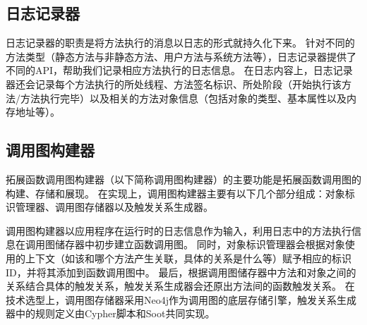 









\subsection{日志记录器}

日志记录器的职责是将方法执行的消息以日志的形式就持久化下来。
针对不同的方法类型（静态方法与非静态方法、用户方法与系统方法等），日志记录器提供了不同的API，帮助我们记录相应方法执行的日志信息。
在日志内容上，日志记录器还会记录每个方法执行的所处线程、方法签名标识、所处阶段（开始执行该方法/方法执行完毕）以及相关的方法对象信息（包括对象的类型、基本属性以及内存地址等）。


 \subsection{调用图构建器}

拓展函数调用图构建器（以下简称调用图构建器）的主要功能是拓展函数调用图的构建、存储和展现。
在实现上，调用图构建器主要有以下几个部分组成：对象标识管理器、调用图存储器以及触发关系生成器。

调用图构建器以应用程序在运行时的日志信息作为输入，利用日志中的方法执行信息在调用图储存器中初步建立函数调用图。
同时，对象标识管理器会根据对象使用的上下文（如该和哪个方法产生关联，具体的关系是什么等）赋予相应的标识ID，并将其添加到函数调用图中。
最后，根据调用图储存器中方法和对象之间的关系结合具体的触发关系，触发关系生成器会还原出方法间的函数触发关系。
在技术选型上，调用图存储器采用Neo4j作为调用图的底层存储引擎，触发关系生成器中的规则定义由Cypher脚本和Soot共同实现。


